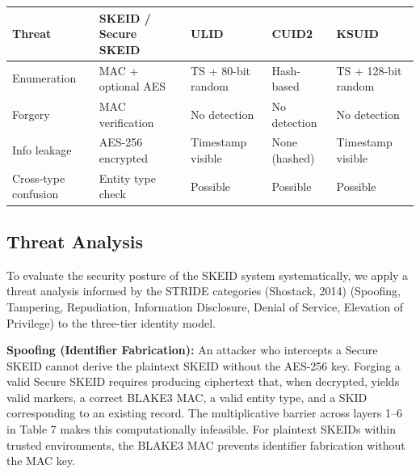 \documentclass[fleqn,10pt]{wlpeerj}
\newcounter{none} %
\begin{document}
{\def\LTcaptype{none} %
\begin{longtable}[]{@{}
  >{\raggedright\arraybackslash}p{}
  >{\raggedright\arraybackslash}p{}
  >{\raggedright\arraybackslash}p{}
  >{\raggedright\arraybackslash}p{}
  >{\raggedright\arraybackslash}p{}@{}}
\toprule\noalign{}
\begin{minipage}[b]{\linewidth}\raggedright
Threat
\end{minipage} & \begin{minipage}[b]{\linewidth}\raggedright
SKEID / Secure SKEID
\end{minipage} & \begin{minipage}[b]{\linewidth}\raggedright
ULID
\end{minipage} & \begin{minipage}[b]{\linewidth}\raggedright
CUID2
\end{minipage} & \begin{minipage}[b]{\linewidth}\raggedright
KSUID
\end{minipage} \\
\midrule\noalign{}
\endhead
\bottomrule\noalign{}
\endlastfoot
Enumeration & MAC + optional AES & TS + 80-bit random & Hash-based & TS
+ 128-bit random \\
Forgery & MAC verification & No detection & No detection & No
detection \\
Info leakage & AES-256 encrypted & Timestamp visible & None (hashed) &
Timestamp visible \\
Cross-type confusion & Entity type check & Possible & Possible &
Possible \\
\end{longtable}
}

\subsection{Threat Analysis}\label{threat-analysis}

To evaluate the security posture of the SKEID system systematically, we
apply a threat analysis informed by the STRIDE categories (Shostack,
2014) (Spoofing, Tampering, Repudiation, Information Disclosure, Denial
of Service, Elevation of Privilege) to the three-tier identity model.

\textbf{Spoofing (Identifier Fabrication):} An attacker who intercepts a
Secure SKEID cannot derive the plaintext SKEID without the AES-256 key.
Forging a valid Secure SKEID requires producing ciphertext that, when
decrypted, yields valid markers, a correct BLAKE3 MAC, a valid entity
type, and a SKID corresponding to an existing record. The multiplicative
barrier across layers 1--6 in Table 7 makes this computationally
infeasible. For plaintext SKEIDs within trusted environments, the BLAKE3
MAC prevents identifier fabrication without the MAC key.
\end{document}
